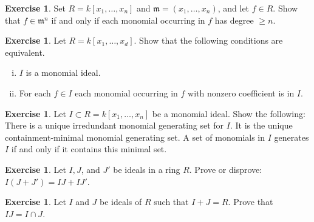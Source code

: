 \documentclass{amsart}
\theoremstyle{plain}
\theoremstyle{definition}
\newtheorem{exercise}[theorem]{Exercise}
\theoremstyle{definition}
\newcommand{\m}{\mathfrak{m}}
\begin{document}
\begin{exercise} %
Set $R=k[x_1,\ldots,x_n]$ and $\m = (x_1,\dots,x_n)$,
and let $f\in R$.
Show that $f\in \m^n$ if and only if each monomial occurring in $f$
has degree $\geq n$.
\end{exercise}

\begin{exercise} %
Let $R=k[x_1,\ldots,x_d]$.
Show that the following conditions are equivalent.
\begin{enumerate}[(i)]
\item $I$ is a monomial ideal.
\item For each $f\in I$ each monomial occurring in $f$ with nonzero coefficient is in $I$.
\end{enumerate}
\end{exercise}


\begin{exercise}
Let $I \subset R = k[x_1,\dots,x_n]$ be a monomial ideal. Show the following:
There is a unique irredundant monomial generating set for $I$.
It is the unique containment-minimal monomial generating set.
A set of monomials in $I$ generates $I$ if and only if it contains this minimal set.
\end{exercise}

\begin{exercise} %
Let $I, J$, and $J'$ be ideals in a ring $R$.  Prove or disprove: $I(J + J') = IJ + IJ'$.
\end{exercise}

\begin{exercise} %
Let $I$ and $J$ be ideals of $R$ such that $I+J = R$.  Prove that $IJ = I \cap J$.
\end{exercise}



\end{document}
